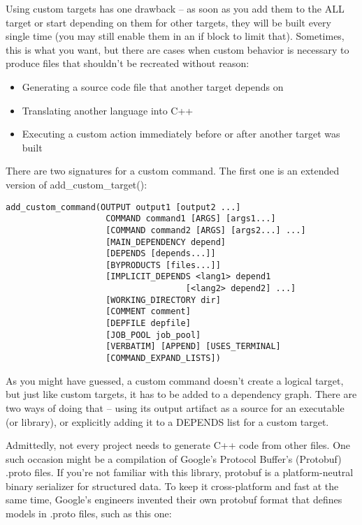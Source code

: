 
Using custom targets has one drawback – as soon as you add them to the ALL target or start depending on them for other targets, they will be built every single time (you may still enable them in an if block to limit that). Sometimes, this is what you want, but there are cases when custom behavior is necessary to produce files that shouldn't be recreated without reason:

\begin{itemize}
\item 
Generating a source code file that another target depends on

\item 
Translating another language into C++

\item 
Executing a custom action immediately before or after another target was built
\end{itemize}

There are two signatures for a custom command. The first one is an extended version of add\_custom\_target():

\begin{lstlisting}[style=styleCMake]
add_custom_command(OUTPUT output1 [output2 ...]
					COMMAND command1 [ARGS] [args1...]
					[COMMAND command2 [ARGS] [args2...] ...]
					[MAIN_DEPENDENCY depend]
					[DEPENDS [depends...]]
					[BYPRODUCTS [files...]]
					[IMPLICIT_DEPENDS <lang1> depend1
									[<lang2> depend2] ...]
					[WORKING_DIRECTORY dir]
					[COMMENT comment]
					[DEPFILE depfile]
					[JOB_POOL job_pool]
					[VERBATIM] [APPEND] [USES_TERMINAL]
					[COMMAND_EXPAND_LISTS])
\end{lstlisting}

As you might have guessed, a custom command doesn't create a logical target, but just like custom targets, it has to be added to a dependency graph. There are two ways of doing that – using its output artifact as a source for an executable (or library), or explicitly adding it to a DEPENDS list for a custom target.


Admittedly, not every project needs to generate C++ code from other files. One such occasion might be a compilation of Google's Protocol Buffer's (Protobuf) .proto files. If you're not familiar with this library, protobuf is a platform-neutral binary serializer for structured data. To keep it cross-platform and fast at the same time, Google's engineers invented their own protobuf format that defines models in .proto files, such as this one:

